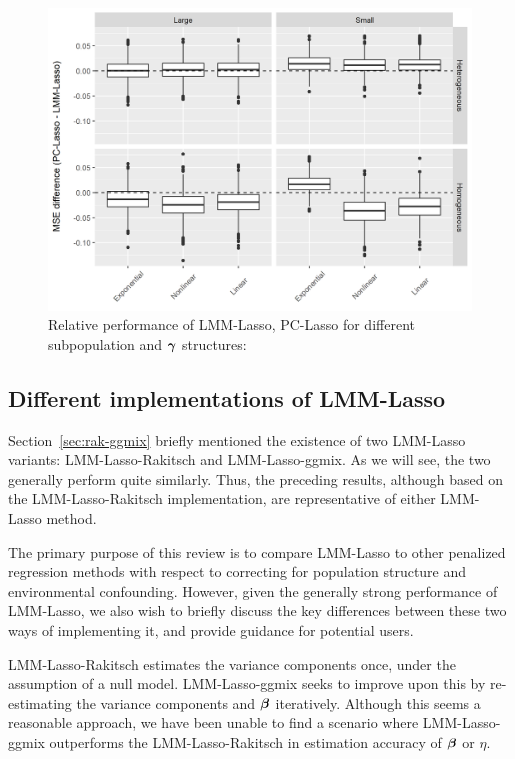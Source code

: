 \begin{figure}[H]
    \centering
    \includegraphics[scale = 0.9]{figures/mse_diff_hetero.png}
    \caption{Relative performance of LMM-Lasso, PC-Lasso for different subpopulation and $\boldsymbol{\gamma}$ structures: }
    \label{fig:big_small_gamma}
\end{figure}

\subsection{Different implementations of LMM-Lasso}

Section~\ref{sec:rak-ggmix} briefly mentioned the existence of two LMM-Lasso variants: LMM-Lasso-Rakitsch and LMM-Lasso-ggmix. As we will see, the two generally perform quite similarly. Thus, the preceding results, although based on the LMM-Lasso-Rakitsch implementation, are representative of either LMM-Lasso method.

The primary purpose of this review is to compare LMM-Lasso to other penalized regression methods with respect to correcting for population structure and environmental confounding. However, given the generally strong performance of LMM-Lasso, we also wish to briefly discuss the key differences between these two ways of implementing it, and provide guidance for potential users.

LMM-Lasso-Rakitsch estimates the variance components once, under the assumption of a null model. LMM-Lasso-ggmix seeks to improve upon this by re-estimating the variance components and $\boldsymbol{\beta}$ iteratively. Although this seems a reasonable approach, we have been unable to find a scenario where LMM-Lasso-ggmix outperforms the LMM-Lasso-Rakitsch in estimation accuracy of $\boldsymbol{\beta}$ or $\eta$. 

